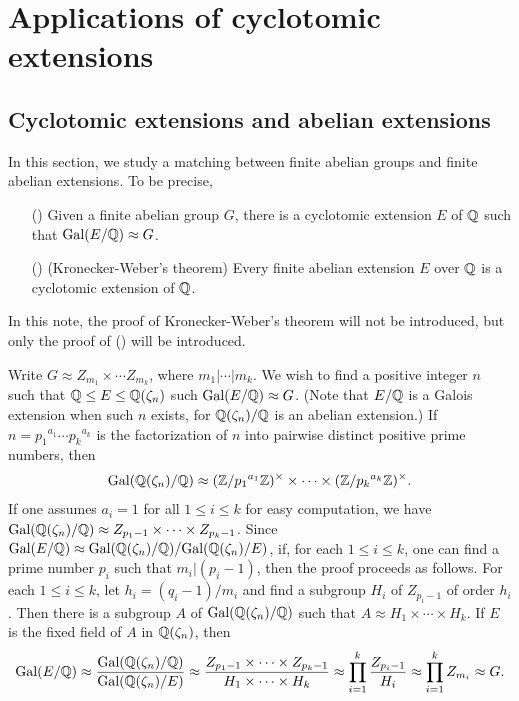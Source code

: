 \section{Applications of cyclotomic extensions}

\subsection{Cyclotomic extensions and abelian extensions}

In this section, we study a matching between finite abelian groups and finite abelian extensions.
To be precise,
\begin{enumerate}
    \item[(\Romannumeral{1})]
    {
        Given a finite abelian group $G$, there is a cyclotomic extension $E$ of ${\mathbb{Q}}$ such that ${\textrm{Gal}({E/{\mathbb{Q}}})}\approx G$.
    }
    \item[(\Romannumeral{2})]
    {
        (Kronecker-Weber's theorem)
        Every finite abelian extension $E$ over ${\mathbb{Q}}$ is a cyclotomic extension of ${\mathbb{Q}}$.
    }
\end{enumerate}
In this note, the proof of Kronecker-Weber's theorem will not be introduced, but only the proof of () will be introduced.
\begin{sketch}
    Write $G\approx Z_{m_1}\times\cdots Z_{m_k}$, where $m_1|\cdots|m_k$.
    We wish to find a positive integer $n$ such that ${\mathbb{Q}}\leq E\leq{\mathbb{Q}}(\zeta_n)$ such ${\textrm{Gal}({E/{\mathbb{Q}}})}\approx G$.
    (Note that $E/{\mathbb{Q}}$ is a Galois extension when such $n$ exists, for ${\mathbb{Q}}(\zeta_n)/{\mathbb{Q}}$ is an abelian extension.)
    If $n={p_1}^{a_1}\cdots{p_k}^{a_k}$ is the factorization of $n$ into pairwise distinct positive prime numbers, then
    \begin{align*}
        {\textrm{Gal}({{\mathbb{Q}}(\zeta_n)/{\mathbb{Q}}})}\approx({\mathbb{Z}}/{p_1}^{a_1}{\mathbb{Z}})^\times\times\cdots\times({\mathbb{Z}}/{p_k}^{a_k}{\mathbb{Z}})^\times.
    \end{align*}
    If one assumes $a_i=1$ for all $1\leq i\leq k$ for easy computation, we have ${\textrm{Gal}({{\mathbb{Q}}(\zeta_n)/{\mathbb{Q}}})}\approx Z_{p_1-1}\times\cdots\times Z_{p_k-1}$. 
    Since ${\textrm{Gal}({E/{\mathbb{Q}}})}\approx{\textrm{Gal}({{\mathbb{Q}}(\zeta_n)/{\mathbb{Q}}})}/{\textrm{Gal}({{\mathbb{Q}}(\zeta_n)/E})}$, \color{teal}if, for each $1\leq i\leq k$, one can find a prime number $p_i$ such that $m_i|(p_i-1)$\color{black}, then the proof proceeds as follows.
    For each $1\leq i\leq k$, let $h_i=(q_i-1)/{m_i}$ and find a subgroup $H_i$ of $Z_{p_i-1}$ of order $h_i$.
    Then there is a subgroup $A$ of ${\textrm{Gal}({{\mathbb{Q}}(\zeta_n)/{\mathbb{Q}}})}$ such that $A\approx H_1\times\cdots\times H_k$.
    If $E$ is the fixed field of $A$ in ${\mathbb{Q}}(\zeta_n)$, then
    \begin{align*}
        {\textrm{Gal}({E/{\mathbb{Q}}})}
        \approx\frac{{\textrm{Gal}({{\mathbb{Q}}(\zeta_n)/{\mathbb{Q}}})}}{{\textrm{Gal}({{\mathbb{Q}}(\zeta_n)/E})}}
        \approx\frac{Z_{p_1-1}\times\cdots\times Z_{p_k-1}}{H_1\times\cdots\times H_k}
        \approx\prod_{i=1}^k\frac{Z_{p_i-1}}{H_i}
        \approx\prod_{i=1}^k Z_{m_i}
        \approx G.
    \end{align*}
\end{sketch}

